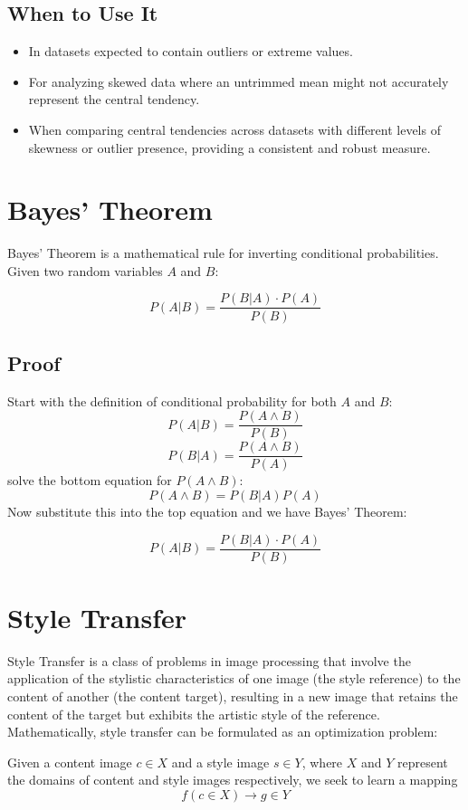 \documentclass[12pt]{article}
\begin{document}
\subsection{When to Use It}

\begin{itemize}
    \item In datasets expected to contain outliers or extreme values.
    \item For analyzing skewed data where an untrimmed mean might not accurately represent the central tendency.
    \item When comparing central tendencies across datasets with different levels of skewness or outlier presence, providing a consistent and robust measure.
\end{itemize}
\section{Bayes' Theorem}
Bayes' Theorem is a mathematical rule for inverting conditional probabilities. Given two random variables \(A\) and \(B\):

\[P(A|B) = \frac{P(B|A)\cdot P(A)}{P(B)}\]

\subsection{Proof}
Start with the definition of conditional probability for both \(A\) and \(B\):
\[P(A|B) = \frac{P(A \land B)}{P(B)}\]
\[P(B|A) = \frac{P(A \land B)}{P(A)}\]
solve the bottom equation for \(P(A \land B)\):
\[P(A \land B) = P(B|A)P(A)\]
Now substitute this into the top equation and we have Bayes' Theorem:

\[P(A|B) = \frac{P(B|A)\cdot P(A)}{P(B)}\]

\section{Style Transfer}
Style Transfer is a class of problems in image processing that involve the application of the stylistic characteristics of one image (the style reference) to the content of another (the content target), resulting in a new image that retains the content of the target but exhibits the artistic style of the reference. Mathematically, style transfer can be formulated as an optimization problem:

Given a content image \(c \in X\) and a style image \(s \in Y\), where \(X\) and \(Y\) represent the domains of content and style images respectively, we seek to learn a mapping \[f(c \in X) \rightarrow g \in Y\] 
\end{document}
